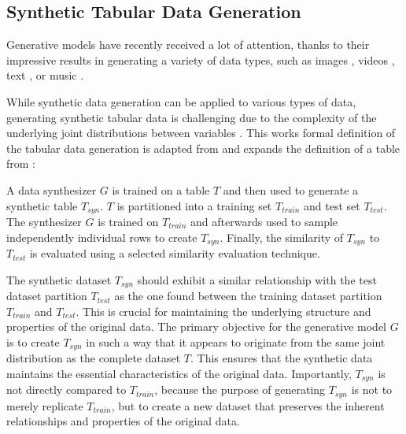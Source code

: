 \subsection{Synthetic Tabular Data Generation}
\label{sec: synthetic tabular data generation}

Generative models have recently received a lot of attention, thanks to their impressive results in generating a variety of data types, 
such as images \cite{ho2020DenoisingDiffusionProbabilistic, dhariwal2021DiffusionModelsBeat, rombach2022HighResolutionImageSynthesis}, videos \cite{ho2022VideoDiffusionModels, runwayGen1Runway}, text \cite{radford2018ImprovingLanguageUnderstanding, openai2022ChatGPTOptimizingLanguage}, or music \cite{agostinelli2023MusicLMGeneratingMusic, Forsgren_Martiros_2022}.

While synthetic data generation can be applied to various types of data, generating synthetic tabular data is challenging due to the complexity of the underlying joint distributions between variables \cite{borisov2022DeepNeuralNetworks}.
This works formal definition of the tabular data generation is adapted from \cite[p. 2]{xu2019ModelingTabularData} and expands the definition of a table from :

\begin{displayquote}
    A data synthesizer $G$ is trained on a table $T$ and then used to generate a synthetic table $T_{syn}$. %
    $T$ is partitioned into a training set $T_{train}$ and test set $T_{test}$. 
    The synthesizer $G$ is trained on $T_{train}$ and afterwards used to sample independently individual rows to create $T_{syn}$.
    Finally, the similarity of $T_{syn}$ to $T_{test}$ is evaluated using a selected similarity evaluation technique.
\end{displayquote}

The synthetic dataset $T_{syn}$ should exhibit a similar relationship with the test dataset partition $T_{test}$ 
as the one found between the training dataset partition $T_{train}$ and $T_{test}$. 
This is crucial for maintaining the underlying structure and properties of the original data.
The primary objective for the generative model $G$ is to create $T_{syn}$ in such a way that it appears to originate from the same joint distribution as the complete dataset $T$. 
This ensures that the synthetic data maintains the essential characteristics of the original data.
Importantly, $T_{syn}$ is not directly compared to $T_{train}$, because the purpose of generating $T_{syn}$ is not to merely replicate $T_{train}$,
but to create a new dataset that preserves the inherent relationships and properties of the original data.


